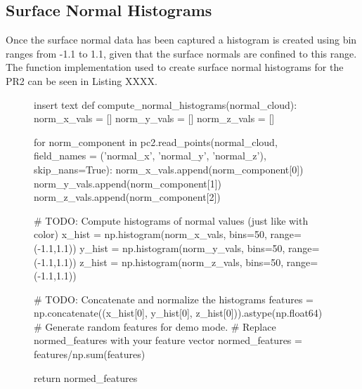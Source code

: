 \documentclass[a4paper]{article}
\begin{document}
\subsection{Surface Normal Histograms}
Once the surface normal data has been captured a histogram is created using bin ranges from -1.1 to 1.1, given that the surface normals are confined to this range. The function implementation used to create surface normal histograms for the PR2 can be seen in Listing XXXX.
\begin{figure}[h]\scriptsize
\begin{sexylisting}{insert text}
def compute_normal_histograms(normal_cloud):
	norm_x_vals = []
	norm_y_vals = []
	norm_z_vals = []

	for norm_component in pc2.read_points(normal_cloud,
	field_names = ('normal_x', 'normal_y', 'normal_z'),
	skip_nans=True):
		norm_x_vals.append(norm_component[0])
		norm_y_vals.append(norm_component[1])
		norm_z_vals.append(norm_component[2])

	# TODO: Compute histograms of normal values (just like with color)
	x_hist = np.histogram(norm_x_vals, bins=50, range=(-1.1,1.1))
	y_hist = np.histogram(norm_y_vals, bins=50, range=(-1.1,1.1))
	z_hist = np.histogram(norm_z_vals, bins=50, range=(-1.1,1.1))

	# TODO: Concatenate and normalize the histograms
	features = np.concatenate((x_hist[0], y_hist[0], z_hist[0])).astype(np.float64)
	# Generate random features for demo mode.
	# Replace normed_features with your feature vector
	normed_features = features/np.sum(features)

	return normed_features	
\end{sexylisting}
\end{figure}
\end{document}
